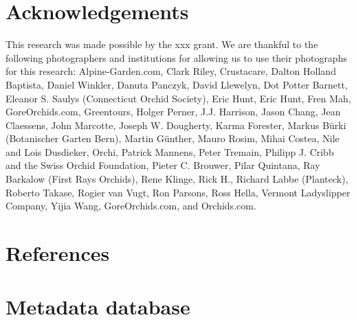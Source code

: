 \documentclass[3p,twocolumn,10pt]{elsarticle}
\begin{document}

\section*{Acknowledgements}
\label{sec:acknowledgements}


This research was made possible by the xxx grant. We are thankful to the following photographers and institutions for allowing us to use their photographs for this research: Alpine-Garden.com, Clark Riley, Crustacare, Dalton Holland Baptista, Daniel Winkler, Danuta Panczyk, David Llewelyn, Dot Potter Barnett, Eleanor S. Saulys (Connecticut Orchid Society), Eric Hunt, Eric Hunt, Fren Mah, GoreOrchids.com, Greentours, Holger Perner, J.J. Harrison, Jason Chang, Jean Claessens, John Marcotte, Joseph W. Dougherty, Karma Forester, Markus Bürki (Botanischer Garten Bern), Martin Günther, Mauro Rosim, Mihai Costea, Nile and Lois Dusdieker, Orchi, Patrick Mannens, Peter Tremain, Philipp J. Cribb and the Swiss Orchid Foundation, Pieter C. Brouwer, Pilar Quintana, Ray Barkalow (First Rays Orchids), Rene Klinge, Rick H., Richard Labbe (Planteck), Roberto Takase, Rogier van Vugt, Ron Parsons, Ross Hella, Vermont Ladyslipper Company, Yijia Wang, GoreOrchids.com, and Orchids.com.



\section*{References}





\appendix
\onecolumn

\section{Metadata database}
\label{sec:meta-database}
\end{document}
